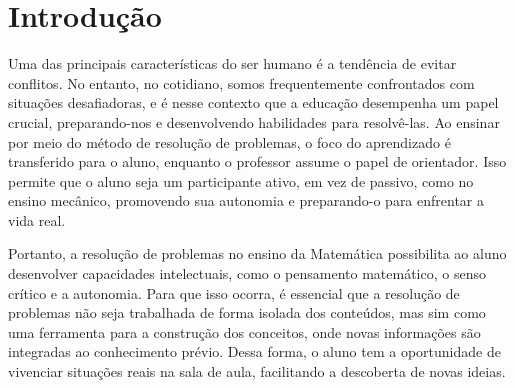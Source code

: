




\pretextual{} %

\imprimircapa{} %
\imprimirfolhaderosto{} %













\textual{} %

\chapter{Introdução} \label{cap:1_introducao}

Uma das principais características do ser humano é a tendência de evitar conflitos. No entanto, no cotidiano, somos frequentemente confrontados com situações desafiadoras, e é nesse contexto que a educação desempenha um papel crucial, preparando-nos e desenvolvendo habilidades para resolvê-las. Ao ensinar por meio do método de resolução de problemas, o foco do aprendizado é transferido para o aluno, enquanto o professor assume o papel de orientador. Isso permite que o aluno seja um participante ativo, em vez de passivo, como no ensino mecânico, promovendo sua autonomia e preparando-o para enfrentar a vida real.

Portanto, a resolução de problemas no ensino da Matemática possibilita ao aluno desenvolver capacidades intelectuais, como o pensamento matemático, o senso crítico e a autonomia. Para que isso ocorra, é essencial que a resolução de problemas não seja trabalhada de forma isolada dos conteúdos, mas sim como uma ferramenta para a construção dos conceitos, onde novas informações são integradas ao conhecimento prévio. Dessa forma, o aluno tem a oportunidade de vivenciar situações reais na sala de aula, facilitando a descoberta de novas ideias.

